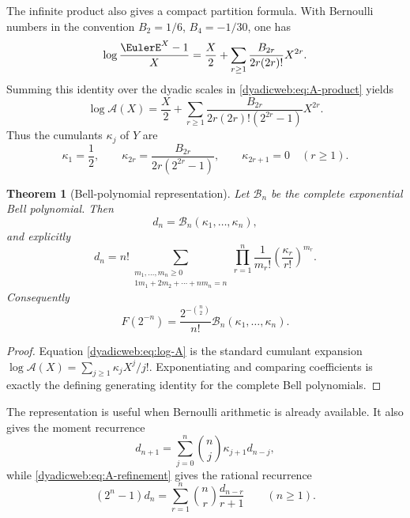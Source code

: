 \documentclass[11pt,oneside]{article}
\newtheorem{theorem}{Theorem}[section]
\theoremstyle{definition}
\theoremstyle{remark}
\begin{document}
The infinite product also gives a compact partition formula.  With Bernoulli numbers in the
convention $B_2=1/6$, $B_4=-1/30$, one has
\begin{equation}
 \log\frac{\EulerE^X-1}{X}
 =\frac X2+\sum_{r\ge1}\frac{B_{2r}}{2r(2r)!}X^{2r}.      \label{dyadicweb:eq:log-exprel}
\end{equation}
Summing this identity over the dyadic scales in \eqref{dyadicweb:eq:A-product} yields
\begin{equation}
 \log\mathscr A(X)
 =\frac X2+
  \sum_{r\ge1}
  \frac{B_{2r}}{2r(2r)!(2^{2r}-1)}X^{2r}.                 \label{dyadicweb:eq:log-A}
\end{equation}
Thus the cumulants $\kappa_j$ of $Y$ are
\begin{equation}
 \kappa_1=\frac12,\qquad
 \kappa_{2r}=\frac{B_{2r}}{2r(2^{2r}-1)},\qquad
 \kappa_{2r+1}=0\quad(r\ge1).                            \label{dyadicweb:eq:Y-cumulants}
\end{equation}

\begin{theorem}[Bell-polynomial representation]
\label{dyadicweb:thm:bell-d}
Let $\mathcal B_n$ be the complete exponential Bell polynomial.  Then
\begin{equation}
 d_n=\mathcal B_n(\kappa_1,\ldots,\kappa_n),               \label{dyadicweb:eq:bell-d}
\end{equation}
and explicitly
\begin{equation}
 d_n=n!\!
 \sum_{\substack{m_1,\ldots,m_n\ge0\\
                  1m_1+2m_2+\cdots+nm_n=n}}
 \prod_{r=1}^{n}\frac1{m_r!}
 \left(\frac{\kappa_r}{r!}\right)^{m_r}.                 \label{dyadicweb:eq:partition-d}
\end{equation}
Consequently
\begin{equation}
 \boxed{
 F(2^{-n})=\frac{2^{-\binom n2}}{n!}
 \mathcal B_n(\kappa_1,\ldots,\kappa_n).}                 \label{dyadicweb:eq:inverse-bell}
\end{equation}
\end{theorem}

\begin{proof}
Equation \eqref{dyadicweb:eq:log-A} is the standard cumulant expansion
$\log\mathscr A(X)=\sum_{j\ge1}\kappa_jX^j/j!$.  Exponentiating and comparing coefficients
is exactly the defining generating identity for the complete Bell polynomials.
\end{proof}

The representation is useful when Bernoulli arithmetic is already available.  It also gives
the moment recurrence
\begin{equation}
 d_{n+1}=\sum_{j=0}^{n}\binom nj\kappa_{j+1}d_{n-j},       \label{dyadicweb:eq:cumulant-moment-recurrence}
\end{equation}
while \eqref{dyadicweb:eq:A-refinement} gives the rational recurrence
\begin{equation}
 (2^n-1)d_n
 =\sum_{r=1}^{n}\binom nr\frac{d_{n-r}}{r+1}
 \qquad(n\ge1).                                           \label{dyadicweb:eq:d-recurrence-companion}
\end{equation}
\end{document}

